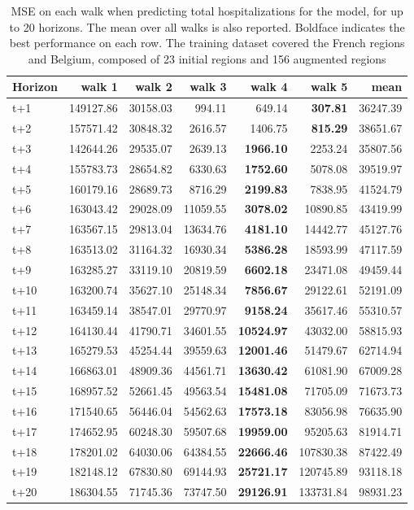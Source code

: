 \begin{table}[H]
\centering
\caption{MSE on each walk when predicting total hospitalizations for the model, for up to 20 horizons. The mean over all walks is also reported. Boldface indicates the best performance on each row. The training dataset covered the French regions and Belgium, composed of 23 initial regions and 156 augmented regions }
\label{tab:MSE_walk_encoder_decoder}
\begin{tabular}{lrrrrrr}
\toprule
Horizon &    walk 1 &   walk 2 &   walk 3 &   walk 4 &    walk 5 &     mean \\
\midrule
t+1  & 149127.86  & 30158.03  & 994.11  & 649.14  & \textbf{307.81}  & 36247.39  \\
t+2  & 157571.42  & 30848.32  & 2616.57  & 1406.75  & \textbf{815.29}  & 38651.67  \\
t+3  & 142644.26  & 29535.07  & 2639.13  & \textbf{1966.10}  & 2253.24  & 35807.56  \\
t+4  & 155783.73  & 28654.82  & 6330.63  & \textbf{1752.60}  & 5078.08  & 39519.97  \\
t+5  & 160179.16  & 28689.73  & 8716.29  & \textbf{2199.83}  & 7838.95  & 41524.79  \\
t+6  & 163043.42  & 29028.09  & 11059.55  & \textbf{3078.02}  & 10890.85  & 43419.99  \\
t+7  & 163567.15  & 29813.04  & 13634.76  & \textbf{4181.10}  & 14442.77  & 45127.76  \\
t+8  & 163513.02  & 31164.32  & 16930.34  & \textbf{5386.28}  & 18593.99  & 47117.59  \\
t+9  & 163285.27  & 33119.10  & 20819.59  & \textbf{6602.18}  & 23471.08  & 49459.44  \\
t+10  & 163200.74  & 35627.10  & 25148.34  & \textbf{7856.67}  & 29122.61  & 52191.09  \\
t+11  & 163459.14  & 38547.01  & 29770.97  & \textbf{9158.24}  & 35617.46  & 55310.57  \\
t+12  & 164130.44  & 41790.71  & 34601.55  & \textbf{10524.97}  & 43032.00  & 58815.93  \\
t+13  & 165279.53  & 45254.44  & 39559.63  & \textbf{12001.46}  & 51479.67  & 62714.94  \\
t+14  & 166863.01  & 48909.36  & 44561.71  & \textbf{13630.42}  & 61081.90  & 67009.28  \\
t+15  & 168957.52  & 52661.45  & 49563.54  & \textbf{15481.08}  & 71705.09  & 71673.73  \\
t+16  & 171540.65  & 56446.04  & 54562.63  & \textbf{17573.18}  & 83056.98  & 76635.90  \\
t+17  & 174652.95  & 60248.30  & 59507.68  & \textbf{19959.00}  & 95205.63  & 81914.71  \\
t+18  & 178201.02  & 64030.06  & 64384.55  & \textbf{22666.46}  & 107830.38  & 87422.49  \\
t+19  & 182148.12  & 67830.80  & 69144.93  & \textbf{25721.17}  & 120745.89  & 93118.18  \\
t+20  & 186304.55  & 71745.36  & 73747.50  & \textbf{29126.91}  & 133731.84  & 98931.23  \\

\bottomrule
\end{tabular}
\end{table}
